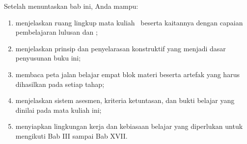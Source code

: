 \begin{tujuanbox}
Setelah menuntaskan bab ini, Anda mampu:
\begin{enumerate}
  \item menjelaskan ruang lingkup mata kuliah \NamaMK\ beserta kaitannya
        dengan capaian pembelajaran lulusan  dan ;
  \item menjelaskan prinsip  dan
        penyelarasan konstruktif yang menjadi dasar penyusunan buku ini;
  \item membaca peta jalan belajar empat blok materi beserta artefak yang
        harus dihasilkan pada setiap tahap;
  \item menjelaskan sistem asesmen, kriteria ketuntasan, dan bukti belajar
        yang dinilai pada mata kuliah ini;
  \item menyiapkan lingkungan kerja dan kebiasaan belajar yang diperlukan
        untuk mengikuti Bab III sampai Bab XVII.
\end{enumerate}
\end{tujuanbox}
